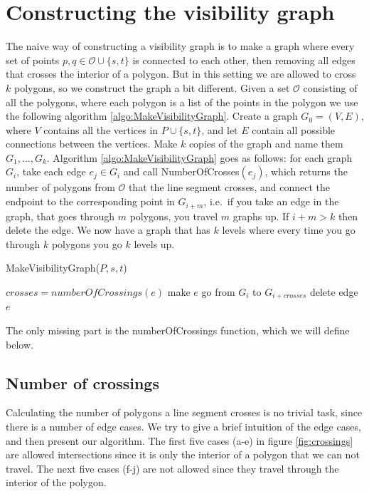 \section{Constructing the visibility graph}
The naive way of constructing a visibility graph is to make a graph
where every set of points $p,q \in \mathcal{O} \cup \{s,t\}$ is connected to each other,
then removing all edges that crosses the interior of a polygon. But in this
setting we are allowed to cross $k$ polygons, so we construct the graph a bit
different. Given a set $\mathcal{O}$ consisting of all the polygons, where each polygon
is a list of the points in the polygon we use the following algorithm \ref{algo:MakeVisibilityGraph}.  
Create a graph $G_0=(V,E)$, where $V$ contains all the vertices in $P\cup \{s,t\}$,
and let $E$ contain all possible connections between the vertices. Make $k$
copies of the graph and name them $G_1,\dots,G_{k}$. Algorithm \ref{algo:MakeVisibilityGraph} goes as
follows: for each graph $G_i$, take each edge $e_j\in G_i$ and call
NumberOfCrosses$(e_j)$, which returns the number of polygons from $\mathcal{O}$ that the
line segment crosses, and connect the endpoint to the corresponding point in
$G_{i+m}$, i.e.\ if you take an edge in the graph, that goes through $m$
polygons, you travel $m$ graphs up. If $i+m > k$ then delete the edge. We now
have a graph that has $k$ levels where every time you go through $k$ polygons
you go $k$ levels up.

\begin{algorithm} 
	\caption{MakeVisibilityGraph($P,s,t$)}
	\begin{algorithmic}[1]
			\State $crosses = numberOfCrossings(e)$
				\State make $e$ go from $G_i$ to $G_{i+crosses}$
			\Else
				\State delete edge $e$
			\EndIf
		\EndFor
		\EndFor
	\end{algorithmic}
	\label{algo:MakeVisibilityGraph}
\end{algorithm}

The only missing part is the numberOfCrossings function, which we will define
below.

\subsection{Number of crossings}
Calculating the number of polygons a line segment crosses is no trivial task,
since there is a number of edge cases. We try to give a brief intuition of the
edge cases, and then present our algorithm.
The first five cases (a-e) in figure \ref{fig:crossings} are allowed intersections since
it is only the interior of a polygon that we can not travel. The
next five cases (f-j) are not allowed since they travel through the interior
of the polygon.

